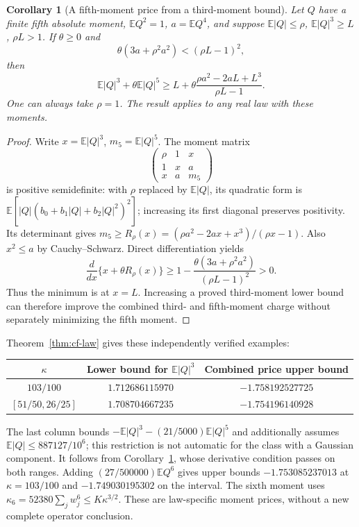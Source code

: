\documentclass[11pt]{article}
\newtheorem{corollary}{Corollary}
\newcommand{\E}{\mathbb E}
\begin{document}
\begin{corollary}[A fifth-moment price from a third-moment bound]\label{cor:hankel-price}
Let $Q$ have a finite fifth absolute moment, $\E Q^2=1$, $a=\E Q^4$, and suppose $\E|Q|\le\rho$, $\E|Q|^3\ge L$, $\rho L>1$. If $\theta\ge0$ and
\begin{equation}\label{eq:price-derivative-condition}
 \theta(3a+\rho^2a^2)<(\rho L-1)^2,
\end{equation}
then
\begin{equation}\label{eq:hankel-price}
 \E|Q|^3+\theta\E|Q|^5
 \ge L+\theta\frac{\rho a^2-2aL+L^3}{\rho L-1}.
\end{equation}
One can always take $\rho=1$. The result applies to any real law with these moments.
\end{corollary}
\begin{proof}
Write $x=\E|Q|^3$, $m_5=\E|Q|^5$. The moment matrix
\begin{equation*}
 \begin{pmatrix}\rho&1&x\\1&x&a\\x&a&m_5\end{pmatrix}
\end{equation*}
is positive semidefinite: with $\rho$ replaced by $\E|Q|$, its quadratic form is $\E[|Q|(b_0+b_1|Q|+b_2|Q|^2)^2]$; increasing its first diagonal preserves positivity. Its determinant gives
$m_5\ge R_\rho(x)=(\rho a^2-2ax+x^3)/(\rho x-1)$.
Also $x^2\le a$ by Cauchy--Schwarz. Direct differentiation yields
\begin{equation*}
 \frac{d}{dx}\{x+\theta R_\rho(x)\}
 \ge1-\frac{\theta(3a+\rho^2a^2)}{(\rho L-1)^2}>0.
\end{equation*}
Thus the minimum is at $x=L$. Increasing a proved third-moment lower bound can therefore improve the combined third- and fifth-moment charge without separately minimizing the fifth moment.
\end{proof}

Theorem~\ref{thm:cf-law} gives these independently verified examples:
\begin{center}\small
\begin{tabular}{ccc}
\hline
$\kappa$ & Lower bound for $\E|Q|^3$ & Combined price upper bound\\\hline
$103/100$ & $1.712686115970$ & $-1.758192527725$\\
$[51/50,26/25]$ & $1.708704667235$ & $-1.754196140928$\\\hline
\end{tabular}
\end{center}
The last column bounds $-\E|Q|^3-(21/5000)\E|Q|^5$ and additionally assumes $\E|Q|\le887127/10^6$; this restriction is not automatic for the class with a Gaussian component. It follows from Corollary~\ref{cor:hankel-price}, whose derivative condition passes on both ranges. Adding $(27/500000)\E Q^6$ gives upper bounds $-1.753085237013$ at $\kappa=103/100$ and $-1.749030195302$ on the interval. The sixth moment uses $\kappa_6=52380\sum_jw_j^6\le K\kappa^{3/2}$. These are law-specific moment prices, without a new complete operator conclusion.
\end{document}
